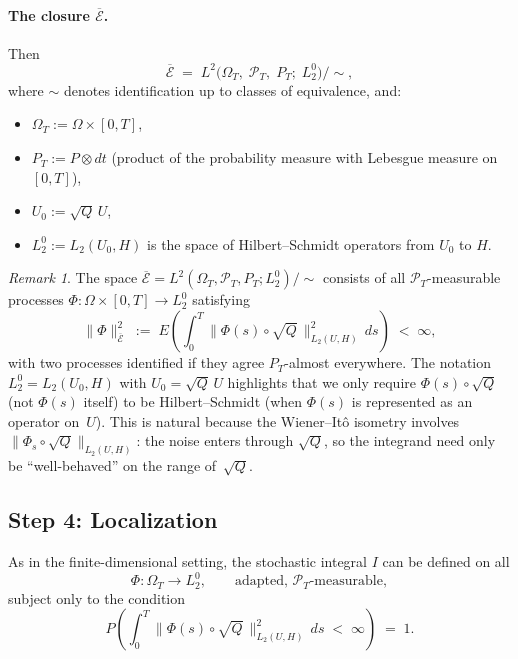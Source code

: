 \documentclass[11pt]{article}
\theoremstyle{definition}
\theoremstyle{remark}
\newtheorem{remark}{Remark}
\begin{document}
\paragraph{The closure $\overline{\mathcal{E}}$.}

Then
\[
    \overline{\mathcal{E}}
    \;=\;
    L^2\!\bigl(\Omega_T,\;\mathcal{P}_T,\;P_T;\;L_2^0\bigr)
    \big/{\sim},
\]
where $\sim$ denotes identification up to classes of equivalence, and:
\begin{itemize}
    \item $\Omega_T := \Omega \times [0,T]$,
    \item $P_T := P \otimes dt$ \quad (product of the probability measure with Lebesgue measure on $[0,T]$),
    \item $U_0 := \sqrt{Q}\,U$,
    \item $L_2^0 := L_2(U_0,H)$
          is the space of Hilbert--Schmidt operators from $U_0$ to $H$.
\end{itemize}

\begin{remark}
The space $\overline{\mathcal{E}} = L^2(\Omega_T, \mathcal{P}_T, P_T; L_2^0)/{\sim}$ consists of all $\mathcal{P}_T$-measurable processes $\Phi \colon \Omega \times [0,T] \to L_2^0$ satisfying
\[
    \|\Phi\|_{\overline{\mathcal{E}}}^2
    \;:=\;
    E\!\left(\int_0^T
    \bigl\|\Phi(s) \circ \sqrt{Q}\,\bigr\|_{L_2(U,H)}^2\,ds
    \right)
    \;<\; \infty,
\]
with two processes identified if they agree $P_T$-almost everywhere.
The notation $L_2^0 = L_2(U_0, H)$ with $U_0=\sqrt{Q}\,U$ highlights that we only require $\Phi(s) \circ \sqrt{Q}$ (not $\Phi(s)$ itself) to be Hilbert--Schmidt (when $\Phi(s)$ is represented as an operator on~$U$).
This is natural because the Wiener--It\^o isometry involves $\|\Phi_s \circ \sqrt{Q}\|_{L_2(U,H)}$:
the noise enters through $\sqrt{Q}$, so the integrand need only be ``well-behaved'' on the range of~$\sqrt{Q}$.
\end{remark}

\subsection*{Step 4: Localization}

As in the finite-dimensional setting, the stochastic integral $I$ can be defined on all
\[
    \Phi \colon \Omega_T \longrightarrow L_2^0,
    \qquad
    \text{adapted, } \mathcal{P}_T\text{-measurable},
\]
subject only to the condition
\[
    P\!\left(
        \int_0^T
        \bigl\|\Phi(s) \circ \sqrt{Q}\,\bigr\|_{L_2(U,H)}^2
        \,ds
        \;<\; \infty
    \right)
    \;=\; 1.
\]
\end{document}
